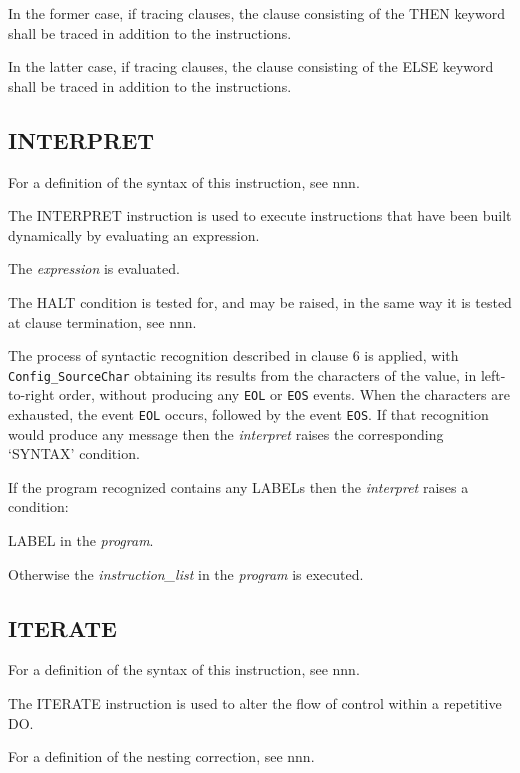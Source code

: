 In the former case, if tracing clauses, the clause consisting of the
THEN keyword shall be traced in addition to the instructions.

In the latter case, if tracing clauses, the clause consisting of the
ELSE keyword shall be traced in addition to the instructions.

\subsection{INTERPRET}\label{interpret}

For a definition of the syntax of this instruction, see nnn.

The INTERPRET instruction is used to execute instructions that have been
built dynamically by evaluating an expression.

The \emph{expression} is evaluated.

The HALT condition is tested for, and may be raised, in the same way it
is tested at clause termination, see nnn.

The process of syntactic recognition described in clause 6 is applied,
with \texttt{Config\_SourceChar} obtaining its results from the
characters of the value, in left-to-right order, without producing any
\texttt{EOL} or \texttt{EOS} events. When the characters are exhausted,
the event \texttt{EOL} occurs, followed by the event \texttt{EOS}. If
that recognition would produce any message then the \emph{interpret}
raises the corresponding `SYNTAX' condition.

If the program recognized contains any LABELs then the \emph{interpret}
raises a condition:


LABEL in the \emph{program}.

Otherwise the \emph{instruction\_list} in the \emph{program} is
executed.

\subsection{ITERATE}\label{iterate}

For a definition of the syntax of this instruction, see nnn.

The ITERATE instruction is used to alter the flow of control within a
repetitive DO.

For a definition of the nesting correction, see nnn.



